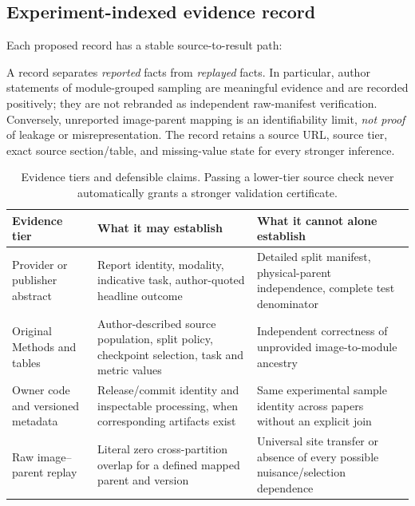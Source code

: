 \documentclass[10pt,a4paper]{article}
\begin{document}
\subsection{Experiment-indexed evidence record}
Each proposed record has a stable source-to-result path:
\begin{center}
\end{center}
A record separates \emph{reported} facts from \emph{replayed} facts. In particular, author statements of module-grouped sampling are meaningful evidence and are recorded positively; they are not rebranded as independent raw-manifest verification. Conversely, unreported image-parent mapping is an identifiability limit, \emph{not proof} of leakage or misrepresentation. The record retains a source URL, source tier, exact source section/table, and missing-value state for every stronger inference.

\begin{table}[ht]
\centering\small
\caption{Evidence tiers and defensible claims. Passing a lower-tier source check never automatically grants a stronger validation certificate.}
\begin{tabularx}{\linewidth}{@{}p{2.25cm}X X@{}}
\toprule Evidence tier & What it may establish & What it cannot alone establish \\
\midrule Provider or publisher abstract & Report identity, modality, indicative task, author-quoted headline outcome & Detailed split manifest, physical-parent independence, complete test denominator \\
Original Methods and tables & Author-described source population, split policy, checkpoint selection, task and metric values & Independent correctness of unprovided image-to-module ancestry \\
Owner code and versioned metadata & Release/commit identity and inspectable processing, when corresponding artifacts exist & Same experimental sample identity across papers without an explicit join \\
Raw image--parent replay & Literal zero cross-partition overlap for a defined mapped parent and version & Universal site transfer or absence of every possible nuisance/selection dependence \\
\bottomrule
\end{tabularx}
\end{table}
\end{document}
